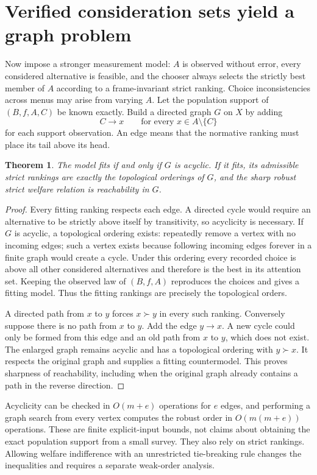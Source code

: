 \documentclass[11pt,a4paper]{article}
\newtheorem{theorem}{Theorem}[section]
\begin{document}
\section{Verified consideration sets yield a graph problem}
Now impose a stronger measurement model: $A$ is observed without error, every considered alternative is feasible, and the chooser always selects the strictly best member of $A$ according to a frame-invariant strict ranking. Choice inconsistencies across menus may arise from varying $A$. Let the population support of $(B,f,A,C)$ be known exactly. Build a directed graph $G$ on $X$ by adding
\[
 C\longrightarrow x\qquad\text{for every }x\in A\setminus\{C\}
\]
for each support observation. An edge means that the normative ranking must place its tail above its head.
\begin{theorem}
The model fits if and only if $G$ is acyclic. If it fits, its admissible strict rankings are exactly the topological orderings of $G$, and the sharp robust strict welfare relation is reachability in $G$.
\end{theorem}
\begin{proof}
Every fitting ranking respects each edge. A directed cycle would require an alternative to be strictly above itself by transitivity, so acyclicity is necessary. If $G$ is acyclic, a topological ordering exists: repeatedly remove a vertex with no incoming edges; such a vertex exists because following incoming edges forever in a finite graph would create a cycle. Under this ordering every recorded choice is above all other considered alternatives and therefore is the best in its attention set. Keeping the observed law of $(B,f,A)$ reproduces the choices and gives a fitting model. Thus the fitting rankings are precisely the topological orders.

A directed path from $x$ to $y$ forces $x\succ y$ in every such ranking. Conversely suppose there is no path from $x$ to $y$. Add the edge $y\to x$. A new cycle could only be formed from this edge and an old path from $x$ to $y$, which does not exist. The enlarged graph remains acyclic and has a topological ordering with $y\succ x$. It respects the original graph and supplies a fitting countermodel. This proves sharpness of reachability, including when the original graph already contains a path in the reverse direction.
\end{proof}
Acyclicity can be checked in $O(m+e)$ operations for $e$ edges, and performing a graph search from every vertex computes the robust order in $O(m(m+e))$ operations. These are finite explicit-input bounds, not claims about obtaining the exact population support from a small survey. They also rely on strict rankings. Allowing welfare indifference with an unrestricted tie-breaking rule changes the inequalities and requires a separate weak-order analysis.
\end{document}
